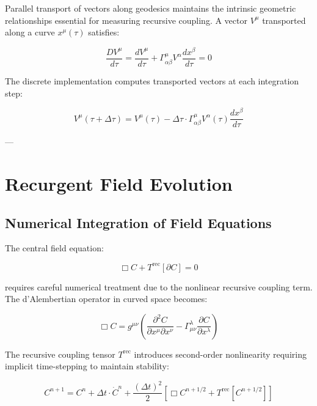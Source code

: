 Parallel transport of vectors along geodesics maintains the intrinsic geometric relationships essential for measuring recursive coupling. A vector $V^{\mu}$ transported along a curve $x^{\mu}(\tau)$ satisfies:

\begin{equation}
\frac{DV^{\mu}}{d\tau} = \frac{dV^{\mu}}{d\tau} + \Gamma^{\mu}_{\alpha\beta} V^{\alpha} \frac{dx^{\beta}}{d\tau} = 0
\end{equation}

The discrete implementation computes transported vectors at each integration step:

\begin{equation}
V^{\mu}(\tau + \Delta\tau) = V^{\mu}(\tau) - \Delta\tau \cdot \Gamma^{\mu}_{\alpha\beta} V^{\alpha}(\tau) \frac{dx^{\beta}}{d\tau}
\end{equation}

---

\section{Recurgent Field Evolution}

\subsection{Numerical Integration of Field Equations}

The central field equation:

\begin{equation}
\Box C + T^{\text{rec}}[\partial C] = 0
\end{equation}

requires careful numerical treatment due to the nonlinear recursive coupling term. The d'Alembertian operator in curved space becomes:

\begin{equation}
\Box C = g^{\mu\nu} \left(\frac{\partial^2 C}{\partial x^{\mu} \partial x^{\nu}} - \Gamma^{\lambda}_{\mu\nu} \frac{\partial C}{\partial x^{\lambda}}\right)
\end{equation}

The recursive coupling tensor $T^{\text{rec}}$ introduces second-order nonlinearity requiring implicit time-stepping to maintain stability:

\begin{equation}
C^{n+1} = C^n + \Delta t \cdot \dot{C}^n + \frac{(\Delta t)^2}{2} \left[\Box C^{n+1/2} + T^{\text{rec}}[C^{n+1/2}]\right]
\end{equation}

